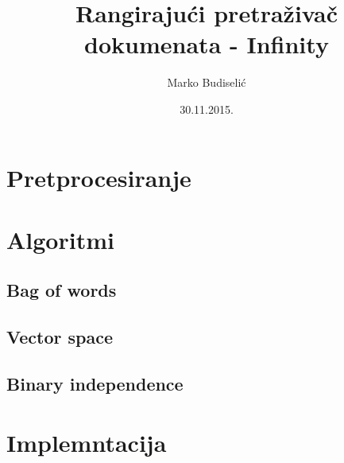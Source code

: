 \documentclass[a4paper,11pt]{article}
\title{Rangirajući pretraživač dokumenata - Infinity}
\author{Marko Budiselić}
\date{30.11.2015.}
\begin{document}
\maketitle

\section{Pretprocesiranje}

\section{Algoritmi}

\subsection{Bag of words}

\subsection{Vector space}

\subsection{Binary independence}

\section{Implemntacija}
\end{document}
